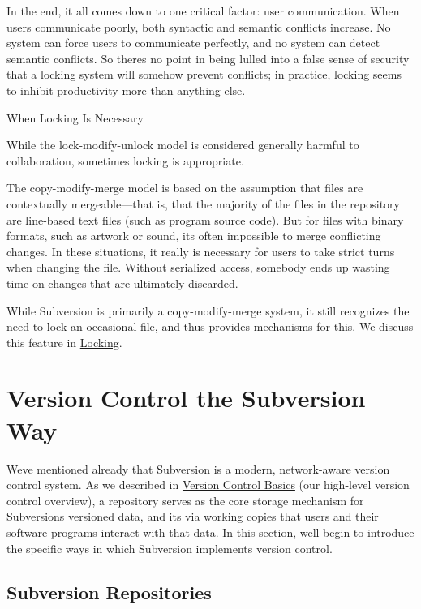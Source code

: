 In the end, it all comes down to one critical factor: user
communication. When users communicate poorly, both syntactic and
semantic conflicts increase. No system can force users to communicate
perfectly, and no system can detect semantic conflicts. So
there\textquotesingle s no point in being lulled into a false sense of
security that a locking system will somehow prevent conflicts; in
practice, locking seems to inhibit productivity more than anything else.

\protect{}\label{svn.basic.vsn-models.copy-merge.sb-1}
When Locking Is Necessary

While the lock-modify-unlock model is considered generally harmful to
collaboration, sometimes locking is appropriate.

The copy-modify-merge model is based on the assumption that files are
contextually mergeable---that is, that the majority of the files in the
repository are line-based text files (such as program source code). But
for files with binary formats, such as artwork or sound,
it\textquotesingle s often impossible to merge conflicting changes. In
these situations, it really is necessary for users to take strict turns
when changing the file. Without serialized access, somebody ends up
wasting time on changes that are ultimately discarded.

While Subversion is primarily a copy-modify-merge system, it still
recognizes the need to lock an occasional file, and thus provides
mechanisms for this. We discuss this feature in
\hyperref[svn.advanced.locking]{Locking}.

\section{Version Control the Subversion Way}\label{svn.basic.in-action}

We\textquotesingle ve mentioned already that Subversion is a modern,
network-aware version control system. As we described in
\hyperref[svn.basic.version-control-basics]{Version Control Basics} (our
high-level version control overview), a repository serves as the core
storage mechanism for Subversion\textquotesingle s versioned data, and
it\textquotesingle s via working copies that users and their software
programs interact with that data. In this section, we\textquotesingle ll
begin to introduce the specific ways in which Subversion implements
version control.

\subsection{Subversion Repositories}\label{svn.basic.svn-repositories}

